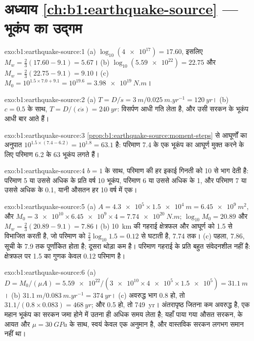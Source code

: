 \section*{अध्याय \ref{ch:b1:earthquake-source} --- भूकंप का उद्गम}

\begin{solution}{exo:b1:earthquake-source:1}
(a) $\log_{10}(\num{4e17}) = 17.60$, इसलिए $M_w = \tfrac23(17.60 - 9.1) = 5.67$।
(b) $\log_{10}(\num{5.59e22}) = 22.75$ और $M_w = \tfrac23(22.75 - 9.1) =
9.10$। (c) $M_0 = 10^{1.5\times7.0 + 9.1} = 10^{19.6} = \qty{3.98e19}{N.m}$।
\end{solution}

\begin{solution}{exo:b1:earthquake-source:2}
(a) $T = D/\dot s = \qty{3}{m}/\qty{0.025}{m.yr^{-1}} = \qty{120}{yr}$।
(b) $c = 0.5$ के साथ, $T = D/(c\dot s) = \qty{240}{yr}$: विसर्पण आधी गति लेता है, और उसी सरकन के भूकंप आधी बार आते हैं।
\end{solution}

\begin{solution}{exo:b1:earthquake-source:3}
\cref{prop:b1:earthquake-source:moment-steps} से आघूर्णों का अनुपात
$10^{1.5\times(7.4 - 6.2)} = 10^{1.8} = 63.1$ है: परिमाण 7.4 के एक भूकंप का आघूर्ण मुक्त करने के लिए परिमाण 6.2 के 63 भूकंप लगते हैं।
\end{solution}

\begin{solution}{exo:b1:earthquake-source:4}
$b = 1$ के साथ, परिमाण की हर इकाई गिनती को 10 से भाग देती है: परिमाण 5 या उससे अधिक के प्रति वर्ष 10 भूकंप, परिमाण 6 या उससे अधिक के 1, और परिमाण 7 या उससे अधिक के 0.1, यानी औसतन हर 10 वर्ष में एक।
\end{solution}

\begin{solution}{exo:b1:earthquake-source:5}
(a) $A = \num{4.3e5} \times \qty{1.5e4}{m} = \qty{6.45e9}{m^2}$, और
$M_0 = \num{3e10}\times\num{6.45e9}\times4 = \qty{7.74e20}{N.m}$;
$\log_{10}M_0 = 20.89$ और $M_w = \tfrac23(20.89 - 9.1) = 7.86$। (b) \qty{10}{km} की गहराई क्षेत्रफल और आघूर्ण को 1.5 से विभाजित करती है, जो परिमाण को
$\tfrac23\log_{10}1.5 = 0.12$ से घटाती है, 7.74 तक। (c) पहला, 7.86, सूची के 7.9 तक पूर्णांकित होता है; दूसरा थोड़ा कम है। परिमाण गहराई के प्रति बहुत संवेदनशील नहीं है: क्षेत्रफल पर 1.5 का गुणक केवल 0.12 परिमाण है।
\end{solution}

\begin{solution}{exo:b1:earthquake-source:6}
(a) $D = M_0/(\mu A) = \num{5.59e22}/(\num{3e10}\times\num{4e5}\times\num{1.5e5})
= \qty{31.1}{m}$। (b) $\qty{31.1}{m}/\qty{0.083}{m.yr^{-1}} = \qty{374}{yr}$।
(c) अवरुद्ध भाग 0.8 हो, तो $31.1/(0.8\times0.083) = \qty{468}{yr}$; और 0.5 हो, तो \qty{749}{yr}। अंतरापृष्ठ जितना कम अवरुद्ध है, एक महान भूकंप का सरकन जमा होने में उतना ही अधिक समय लेता है; यहाँ पाया गया औसत सरकन,  के आयत और $\mu = \qty{30}{GPa}$ के साथ,
स्वयं केवल एक अनुमान है, और वास्तविक सरकन लगभग समान नहीं था।
\end{solution}

